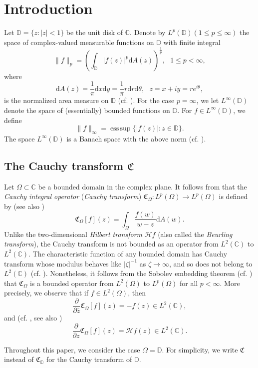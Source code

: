 \documentclass[a4paper,12pt]{amsart}
\theoremstyle{definition}
\numberwithin{equation}{section}
\DeclareMathOperator*{\esssup}{ess\,sup}
\newcommand{\ID}{{\mathbb D}}
\begin{document}
\section{Introduction}\label{sec-1}
Let $\ID=\{z:|z|<1\}$ be the unit disk of $\mathbb{C}$. Denote by $L^p(\ID) (1\leq p\leq\infty)$ the space of
complex-valued measurable functions on $\ID$ with finite integral
$$\|f\|_{p}=\left(\int_{\ID}|f(z)|^p\mathrm{d} A(z)\right)^{\frac{1}{p}},\ \ \ 1\leq p<\infty,$$
where
$$\mathrm{d}A(z) =\frac{1}{\pi}\mathrm{d}x\mathrm{d}y=\frac{1}{\pi}r\mathrm{d}r\mathrm{d}\theta,\ \ \ z=x+iy=re^{i\theta},$$
is the normalized area measure on $\ID$ (cf. \cite[Page 1]{Hendenmalm}). For the case $p=\infty$, we let $L^{\infty}(\ID)$ denote the space of (essentially) bounded
functions on $\ID$. For $f\in L^{\infty}(\ID)$, we define
$$\|f\|_\infty=\esssup\{|f(z)|: z\in\ID\}.$$
The space $L^{\infty}(\ID)$ is a Banach space with the above norm  (cf. \cite[Page 2]{Hendenmalm}).
\subsection{The Cauchy transform $\mathfrak{C}$}
Let $\Omega\subset\mathbb{C}$ be a bounded domain in the complex plane.
It follows from \cite[Page 7]{Baranov} that the {\it Cauchy integral operator} ({\it Cauchy transform}) $\mathfrak{C}_{\Omega}: L^p(\Omega)\rightarrow L^{p}(\Omega)$ is defined by (see also \cite{Anderson, kalaj1})
$$\mathfrak{C}_{\Omega}[f](z)=\int_{\Omega}\frac{f(w)}{w-z}\mathrm{d} A(w).$$
Unlike the two-dimensional {\it Hilbert transform} $\mathcal{H}f$ (also called the {\it Beurling transform}), the Cauchy transform is not bounded as an
operator from $L^2(\mathbb{C})$ to $L^2(\mathbb{C})$. The characteristic function of any bounded domain has Cauchy transform whose modulus behaves like
$|\zeta|^{-1}$ as $\zeta\rightarrow\infty$, and so does not belong to $L^2(\mathbb{C})$ (cf. \cite{Anderson}).
Nonetheless, it follows from the Sobolev embedding theorem (cf. \cite{Anderson, Mazja}) that $\mathfrak{C}_{\Omega}$ is a bounded operator from $L^2(\Omega)$ to $L^p(\Omega)$ for all $p<\infty$. More precisely, we observe that if $f\in L^2(\Omega)$, then
$$\frac{\partial}{\partial\bar{z}}\mathfrak{C}_{\Omega}[f](z)=-f(z)\in L^2(\mathbb{C}),$$
and (cf. \cite[Page 7]{Baranov}, see also \cite[Page 157, (7.10)]{Lehto})
$$\frac{\partial}{\partial z}\mathfrak{C}_{\Omega}[f](z)=\mathcal{H}f(z)\in L^2(\mathbb{C}).$$

Throughout this paper, we consider the case $\Omega=\ID$.
For simplicity, we write $\mathfrak{C}$ instead of $\mathfrak{C}_{\ID}$ for the Cauchy transform of $\ID$.
\end{document}
